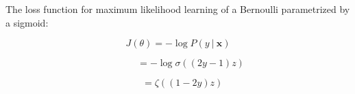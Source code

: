 The loss function for maximum likelihood learning of a Bernoulli parametrized by a sigmoid:

  \begin{equation} \tag{6.24}
   \label{eq_6_24}
   J(\theta)=-\log P(y\ |\ \bm{x})
  \end{equation}
  
  \begin{equation} \tag{6.25}
   \label{eq_6_25}
   \ \ \ \ \ \ \ \ \ \ \ \ =-\log\sigma((2y-1)z)
  \end{equation}
  
  \begin{equation} \tag{6.26}
   \label{eq_6_26}
   \ \ \ \ =\zeta((1-2y)z)
  \end{equation}





